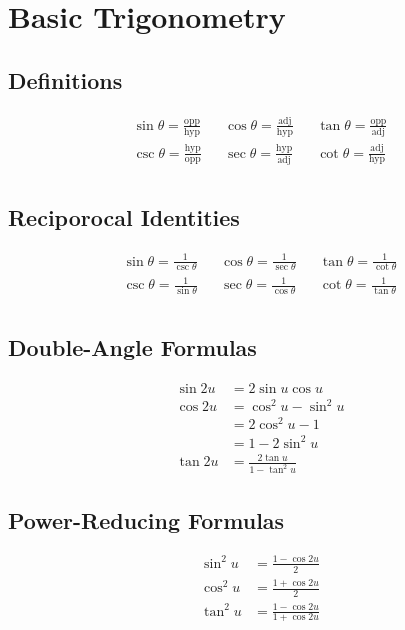 \section{Basic Trigonometry}
\subsection{Definitions}
\begin{align*}
  \sin\theta=\frac{\text{opp}}{\text{hyp}} &&
  \cos\theta=\frac{\text{adj}}{\text{hyp}} &&
  \tan\theta=\frac{\text{opp}}{\text{adj}} \\
  \csc\theta=\frac{\text{hyp}}{\text{opp}} &&
  \sec\theta=\frac{\text{hyp}}{\text{adj}} &&
  \cot\theta=\frac{\text{adj}}{\text{hyp}} \\
\end{align*}

\subsection{Reciporocal Identities}
\begin{align*}
  \sin\theta=\frac{1}{\csc\theta} &&
  \cos\theta=\frac{1}{\sec\theta} &&
  \tan\theta=\frac{1}{\cot\theta} \\
  \csc\theta=\frac{1}{\sin\theta} &&
  \sec\theta=\frac{1}{\cos\theta} &&
  \cot\theta=\frac{1}{\tan\theta} \\
\end{align*}

\subsection{Double-Angle Formulas}
\begin{align*}
  \sin{2u} &= 2\sin{u}\cos{u} \\
  \cos{2u} &= \cos^2{u}-\sin^2{u} \\
           &= 2\cos^2{u}-1 \\
           &= 1-2\sin^2{u} \\
  \tan{2u} &= \frac{2\tan{u}}{1-\tan^2{u}}
\end{align*}

\subsection{Power-Reducing Formulas}
\begin{align*}
  \sin^2{u} &= \frac{1-\cos2u}{2} \\
  \cos^2{u} &= \frac{1+\cos2u}{2} \\
  \tan^2{u} &= \frac{1-\cos2u}{1+\cos2u}
\end{align*}

